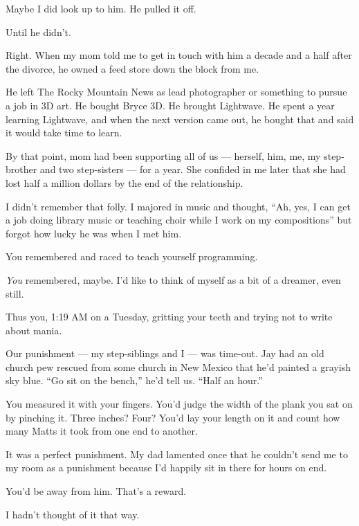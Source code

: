 Maybe I did look up to him. He pulled it off.

\begin{ally}
Until he didn't.
\end{ally}
Right. When my mom told me to get in touch with him a decade and a half after the divorce, he owned a feed store down the block from me.

He left The Rocky Mountain News as lead photographer or something to pursue a job in 3D art. He bought Bryce 3D. He brought Lightwave. He spent a year learning Lightwave, and when the next version came out, he bought that and said it would take time to learn.

By that point, mom had been supporting all of us --- herself, him, me, my step-brother and two step-sisters --- for a year. She confided in me later that she had lost half a million dollars by the end of the relationship.

I didn't remember that folly. I majored in music and thought, ``Ah, yes, I can get a job doing library music or teaching choir while I work on my compositions'' but forgot how lucky he was when I met him.

\begin{ally}
You remembered and raced to teach yourself programming.
\end{ally}
\emph{You} remembered, maybe. I'd like to think of myself as a bit of a dreamer, even still.

\begin{ally}
Thus you, 1:19 AM on a Tuesday, gritting your teeth and trying not to write about mania.
\end{ally}
\newpage

Our punishment --- my step-siblings and I --- was time-out. Jay had an old church pew rescued from some church in New Mexico that he'd painted a grayish sky blue. ``Go sit on the bench,'' he'd tell us. ``Half an hour.''

\begin{ally}
You measured it with your fingers. You'd judge the width of the plank you sat on by pinching it. Three inches? Four? You'd lay your length on it and count how many Matts it took from one end to another.
\end{ally}
It was a perfect punishment. My dad lamented once that he couldn't send me to my room as a punishment because I'd happily sit in there for hours on end.

\begin{ally}
You'd be away from him. That's a reward.
\end{ally}
I hadn't thought of it that way.

